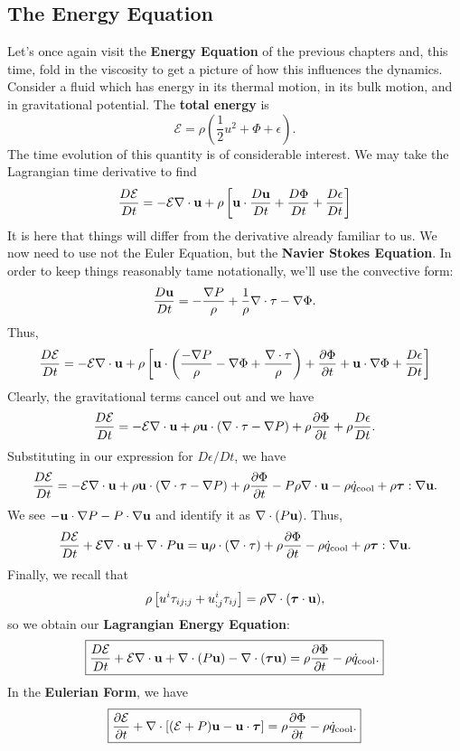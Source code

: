 \subsection{The Energy Equation}
Let's once again visit the \textbf{Energy Equation} of the previous chapters and, this time, fold in the viscosity to get a picture of how this influences the dynamics. Consider a fluid which has energy in its thermal motion, in its bulk motion, and in gravitational potential. The \textbf{total energy} is
\[
\mathcal{E} = \rho\left(\frac{1}{2}u^2 + \Phi + \epsilon\right).
\]
The time evolution of this quantity is of considerable interest. We may take the Lagrangian time derivative to find
\[
\frac{D\mathcal{E}}{Dt} = - \mathcal{E} \nabla \cdot {\bf u} + \rho \left[{\bf u} \cdot \frac{D{\bf u}}{Dt} + \frac{D\Phi}{Dt} + \frac{D\epsilon}{Dt}\right]
\]
It is here that things will differ from the derivative already familiar to us. We now need to use not the Euler Equation, but the \textbf{Navier Stokes Equation}. In order to keep things reasonably tame notationally, we'll use the convective form:
\[
\frac{D{\bf u}}{Dt} = - \frac{\nabla P}{\rho} + \frac{1}{\rho} \nabla \cdot \tau - \nabla \Phi.
\]
Thus,
\[
\frac{D\mathcal{E}}{Dt} = - \mathcal{E} \nabla \cdot {\bf u} + \rho \left[{\bf u} \cdot \left(\frac{-\nabla P}{\rho}-\nabla \Phi +\frac{\nabla \cdot \tau}{\rho}\right) + \frac{\partial \Phi}{\partial t} + {\bf u}\cdot \nabla \Phi + \frac{D\epsilon}{Dt}\right]
\]
Clearly, the gravitational terms cancel out and we have
\[
\frac{D\mathcal{E}}{Dt} = -\mathcal{E}\nabla \cdot {\bf u} + \rho{\bf u} \cdot \left(\nabla \cdot \tau - \nabla P\right) + \rho\frac{\partial \Phi}{\partial t} + \rho\frac{D\epsilon}{Dt}.
\]
Substituting in our expression for $D\epsilon/Dt$, we have
\[
\frac{D\mathcal{E}}{Dt} = -\mathcal{E}\nabla \cdot {\bf u} + \rho{\bf u} \cdot \left(\nabla \cdot \tau - \nabla P\right) + \rho\frac{\partial \Phi}{\partial t} -P \rho\nabla \cdot {\bf u} - \rho \dot{q}_{\rm cool} + \rho\boldsymbol{\tau} : \nabla {\bf u}.
\]
We see $-{\bf u} \cdot \nabla P - P \cdot \nabla {\bf u}$ and identify it as $\nabla\cdot(P{\bf u})$. Thus,
\[
\frac{D\mathcal{E}}{Dt} + \mathcal{E} \nabla \cdot {\bf u} + \nabla \cdot P{\bf u} = {\bf u}\rho\cdot(\nabla \cdot \tau) +\rho \frac{\partial \Phi}{\partial t} - \rho \dot{q}_{\rm cool} + \rho\boldsymbol{\tau} : \nabla{\bf u}.
\]
Finally, we recall that
\[
\rho\left[u^i\tau_{ij;j} + u^i_{;j} \tau_{ij}\right] = \rho \nabla \cdot(\boldsymbol{\tau}\cdot{\bf u}),
\]
so we obtain our \textbf{Lagrangian Energy Equation}:
\begin{equation}
    \boxed{
    \frac{D\mathcal{E}}{Dt} + \mathcal{E} \nabla \cdot {\bf u} + \nabla \cdot (P{\bf u}) - \nabla \cdot (\boldsymbol{\tau}{\bf u}) = \rho \frac{\partial \Phi}{\partial t} - \rho \dot{q}_{\rm cool}.
    }
\end{equation}
In the \textbf{Eulerian Form}, we have
\begin{equation}
    \boxed{
    \frac{\partial \mathcal{E}}{\partial t} + \nabla\cdot\left[(\mathcal{E}+P){\bf u} - {\bf u}\cdot \boldsymbol{\tau}\right] = \rho \frac{\partial \Phi}{\partial t} - \rho \dot{q}_{\rm cool}.
    }
\end{equation}


